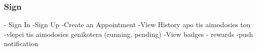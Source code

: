    		\subsubsection{Sign }






	- Sign In
	 -Sign Up
	 -Create an Appointment
	 -View History apo tis aimodosies tou
	 -vlepei tis aimodosies genikotera (running, pending)
	 -View badges - rewards
	 -push notification
	
		

%		
